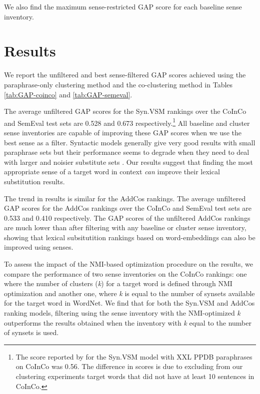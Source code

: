 \documentclass[11pt]{article}
\begin{document}
\noindent We also find the maximum sense-restricted GAP score for each baseline sense inventory.


\section{Results}

We report the unfiltered and best sense-filtered GAP scores achieved using the paraphrase-only clustering method and the co-clustering method in Tables \ref{tab:GAP-coinco} and \ref{tab:GAP-semeval}. 

The average unfiltered GAP scores for the Syn.VSM rankings over the CoInCo and SemEval test sets are 0.528 and 0.673 respectively.\footnote{The score reported by  for the Syn.VSM model with  XXL PPDB paraphrases on CoInCo was 0.56. The difference in scores is due to excluding from our clustering experiments target words that did not have at least 10 sentences in CoInCo.}  All baseline and cluster sense inventories are capable of improving these GAP scores when we use the best sense as a filter. Syntactic models generally give very good results with small paraphrase sets \cite{kremer-EtAl:2014:EACL} but their performance seems to degrade when they need to deal with larger and noisier substitute sets \cite{apidianaki:2016:EMNLP2016}. Our results suggest that finding the most appropriate sense of a target word in context \textit{can} improve their lexical substitution results. 

The trend in results is similar for the AddCos rankings. The average unfiltered GAP scores for the AddCos rankings over the CoInCo and SemEval test sets are 0.533 and 0.410 respectively. The GAP scores of the unfiltered AddCos rankings are much lower than after filtering with any baseline or cluster sense inventory, showing that lexical subsitutition rankings based on word-embeddings can also be improved using senses. 

To assess the impact of the NMI-based optimization procedure on the results, we compare the performance of two sense inventories on the CoInCo rankings: one where the number of clusters (\textit{k}) for a target word is defined through NMI optimization  and another one, where \textit{k} is equal to the number of synsets available for the target word in WordNet. We find that for both the Syn.VSM and AddCos ranking models, filtering using the sense inventory with the NMI-optimized \textit{k} outperforms the results obtained when the inventory with \textit{k} equal to the number of  synsets is used. 
\end{document}
